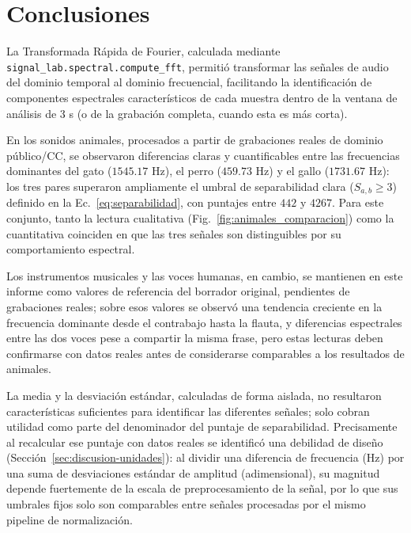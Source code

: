 
\section{Conclusiones}

La Transformada Rápida de Fourier, calculada mediante \texttt{signal\_lab.spectral.compute\_fft}, permitió transformar las señales de audio del dominio temporal al dominio frecuencial, facilitando la identificación de componentes espectrales característicos de cada muestra dentro de la ventana de análisis de 3 s (o de la grabación completa, cuando esta es más corta).

En los sonidos animales, procesados a partir de grabaciones reales de dominio público/CC, se observaron diferencias claras y cuantificables entre las frecuencias dominantes del gato ($1545.17$ Hz), el perro ($459.73$ Hz) y el gallo ($1731.67$ Hz): los tres pares superaron ampliamente el umbral de separabilidad clara ($S_{a,b} \geq 3$) definido en la Ec.~\ref{eq:separabilidad}, con puntajes entre $442$ y $4267$. Para este conjunto, tanto la lectura cualitativa (Fig.~\ref{fig:animales_comparacion}) como la cuantitativa coinciden en que las tres señales son distinguibles por su comportamiento espectral.

Los instrumentos musicales y las voces humanas, en cambio, se mantienen en este informe como valores de referencia del borrador original, pendientes de grabaciones reales; sobre esos valores se observó una tendencia creciente en la frecuencia dominante desde el contrabajo hasta la flauta, y diferencias espectrales entre las dos voces pese a compartir la misma frase, pero estas lecturas deben confirmarse con datos reales antes de considerarse comparables a los resultados de animales.

La media y la desviación estándar, calculadas de forma aislada, no resultaron características suficientes para identificar las diferentes señales; solo cobran utilidad como parte del denominador del puntaje de separabilidad. Precisamente al recalcular ese puntaje con datos reales se identificó una debilidad de diseño (Sección~\ref{sec:discusion-unidades}): al dividir una diferencia de frecuencia (Hz) por una suma de desviaciones estándar de amplitud (adimensional), su magnitud depende fuertemente de la escala de preprocesamiento de la señal, por lo que sus umbrales fijos solo son comparables entre señales procesadas por el mismo pipeline de normalización.

